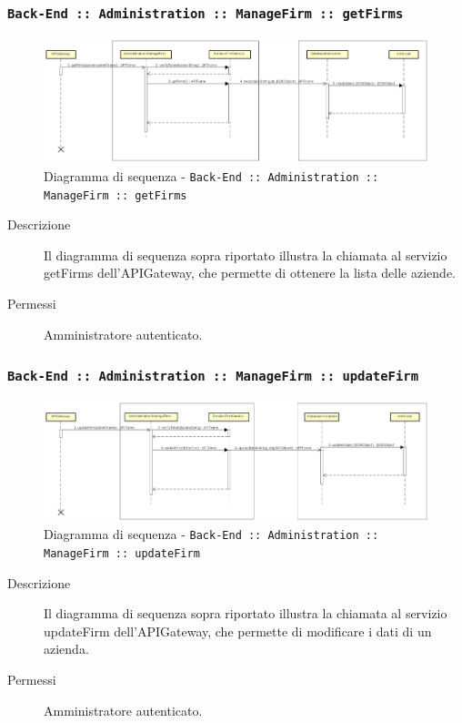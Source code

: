 \documentclass[../DefinizioneDiProdotto.tex]{subfiles}
\begin{document}
		\newpage
		\subsubsection{\texttt{Back-End :: Administration :: ManageFirm :: getFirms}}
		\begin{figure}[!h]
			\centering
			\includegraphics[width=\textwidth]{DiagrammiSequenza/Back-End/manageFirm/getFirms.png}
			\caption{Diagramma di sequenza - \texttt{Back-End :: Administration :: ManageFirm :: getFirms }}
		\end{figure}
		\begin{description}
			\item [Descrizione] Il diagramma di sequenza sopra riportato illustra la chiamata al servizio getFirms dell'APIGateway, che permette di ottenere la lista delle aziende.
			\item [Permessi] Amministratore autenticato.
		\end{description}

		\subsubsection{\texttt{Back-End :: Administration :: ManageFirm :: updateFirm}}
		\begin{figure}[!h]
			\centering
			\includegraphics[width=\textwidth]{DiagrammiSequenza/Back-End/manageFirm/updateFirm.png}
			\caption{Diagramma di sequenza - \texttt{Back-End :: Administration :: ManageFirm :: updateFirm }}
		\end{figure}
		\begin{description}
			\item [Descrizione] Il diagramma di sequenza sopra riportato illustra la chiamata al servizio updateFirm dell'APIGateway, che permette di modificare i dati di un azienda.
			\item [Permessi] Amministratore autenticato.
		\end{description}
\end{document}
